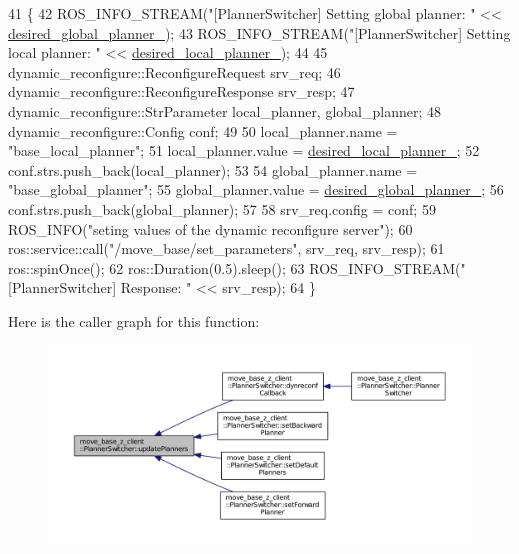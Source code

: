 \begin{DoxyCode}
41 \{
42   ROS\_INFO\_STREAM(\textcolor{stringliteral}{"[PlannerSwitcher] Setting global planner: "} << 
      \hyperlink{classmove__base__z__client_1_1PlannerSwitcher_a004c15858f0a6b9abcd8211d58a7e34c}{desired\_global\_planner\_});
43   ROS\_INFO\_STREAM(\textcolor{stringliteral}{"[PlannerSwitcher] Setting local planner: "} << 
      \hyperlink{classmove__base__z__client_1_1PlannerSwitcher_ae47bd6c9c70b27cddcb394f26bb9372d}{desired\_local\_planner\_});
44 
45   dynamic\_reconfigure::ReconfigureRequest srv\_req;
46   dynamic\_reconfigure::ReconfigureResponse srv\_resp;
47   dynamic\_reconfigure::StrParameter local\_planner, global\_planner;
48   dynamic\_reconfigure::Config conf;
49 
50   local\_planner.name = \textcolor{stringliteral}{"base\_local\_planner"};
51   local\_planner.value = \hyperlink{classmove__base__z__client_1_1PlannerSwitcher_ae47bd6c9c70b27cddcb394f26bb9372d}{desired\_local\_planner\_};
52   conf.strs.push\_back(local\_planner);
53 
54   global\_planner.name = \textcolor{stringliteral}{"base\_global\_planner"};
55   global\_planner.value = \hyperlink{classmove__base__z__client_1_1PlannerSwitcher_a004c15858f0a6b9abcd8211d58a7e34c}{desired\_global\_planner\_};
56   conf.strs.push\_back(global\_planner);
57 
58   srv\_req.config = conf;
59   ROS\_INFO(\textcolor{stringliteral}{"seting values of the dynamic reconfigure server"});
60   ros::service::call(\textcolor{stringliteral}{"/move\_base/set\_parameters"}, srv\_req, srv\_resp);
61   ros::spinOnce();
62   ros::Duration(0.5).sleep();
63   ROS\_INFO\_STREAM(\textcolor{stringliteral}{"[PlannerSwitcher] Response: "} << srv\_resp);
64 \}
\end{DoxyCode}


Here is the caller graph for this function\+:
\nopagebreak
\begin{figure}[H]
\begin{center}
\leavevmode
\includegraphics[width=350pt]{classmove__base__z__client_1_1PlannerSwitcher_a189ac8c027169a111c7d8e14d864752f_icgraph}
\end{center}
\end{figure}





